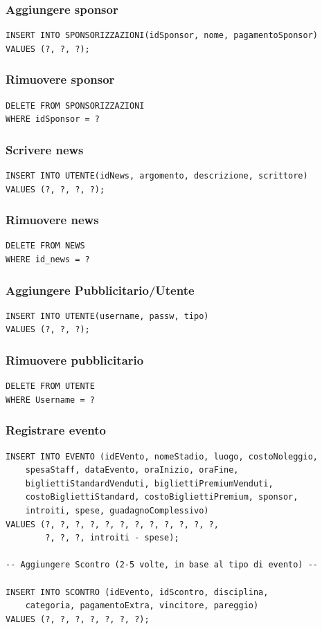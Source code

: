 \documentclass[a4paper,12pt]{report}
\begin{document}
\subsubsection{Aggiungere sponsor}
\begin{verbatim}
INSERT INTO SPONSORIZZAZIONI(idSponsor, nome, pagamentoSponsor)
VALUES (?, ?, ?);
\end{verbatim}
\subsubsection{Rimuovere sponsor}
\begin{verbatim}
DELETE FROM SPONSORIZZAZIONI
WHERE idSponsor = ?
\end{verbatim}
\subsubsection{Scrivere news}
\begin{verbatim}
INSERT INTO UTENTE(idNews, argomento, descrizione, scrittore)
VALUES (?, ?, ?, ?);
\end{verbatim}
\subsubsection{Rimuovere news}
\begin{verbatim}
DELETE FROM NEWS
WHERE id_news = ?
\end{verbatim}
\subsubsection{Aggiungere Pubblicitario/Utente}
\begin{verbatim}
INSERT INTO UTENTE(username, passw, tipo)
VALUES (?, ?, ?);
\end{verbatim}
\subsubsection{Rimuovere pubblicitario}
\begin{verbatim}
DELETE FROM UTENTE
WHERE Username = ?
\end{verbatim}
\subsubsection{Registrare evento}
\begin{verbatim}
INSERT INTO EVENTO (idEVento, nomeStadio, luogo, costoNoleggio,
    spesaStaff, dataEvento, oraInizio, oraFine, 
    bigliettiStandardVenduti, bigliettiPremiumVenduti, 
    costoBigliettiStandard, costoBigliettiPremium, sponsor, 
    introiti, spese, guadagnoComplessivo)
VALUES (?, ?, ?, ?, ?, ?, ?, ?, ?, ?, ?, ?, 
        ?, ?, ?, introiti - spese);

-- Aggiungere Scontro (2-5 volte, in base al tipo di evento) --

INSERT INTO SCONTRO (idEvento, idScontro, disciplina, 
    categoria, pagamentoExtra, vincitore, pareggio)
VALUES (?, ?, ?, ?, ?, ?, ?);

\end{verbatim}
\end{document}
